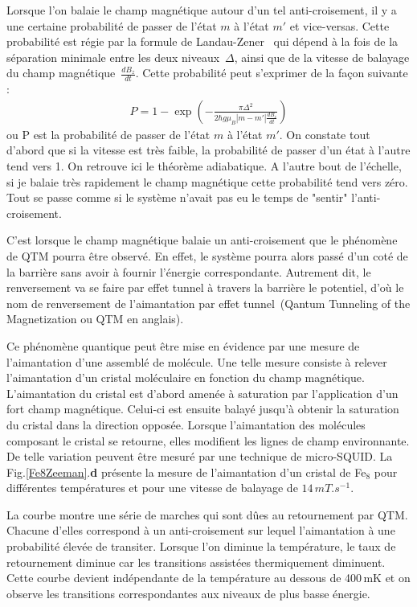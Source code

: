 Lorsque l'on balaie le champ magnétique autour d'un tel anti-croisement, il y a une certaine probabilité de passer de l'état $m$ à l'état $m'$ et vice-versas. Cette probabilité est régie par la formule de Landau-Zener~\cite{Zener1932} qui dépend à la fois de la séparation minimale entre les deux niveaux~$\Delta$, ainsi que de la vitesse de balayage du champ magnétique~$\frac{dB_z}{dt}$. Cette probabilité peut s'exprimer de la façon suivante :
\begin{eqnarray}
P = 1 - \exp \left( -\frac{\pi \Delta^2}{2 \hbar g \mu_B |m-m'|\frac{dB_z}{dt}} \right)
\end{eqnarray}
ou P est la probabilité de passer de l'état $m$ à l'état $m'$. On constate tout d'abord que si la vitesse est très faible, la probabilité de passer d'un état à l'autre tend vers 1. On retrouve ici le théorème adiabatique. A l'autre bout de l'échelle, si je balaie très rapidement le champ magnétique cette probabilité tend vers zéro. Tout se passe comme si le système n'avait pas eu le temps de "sentir" l'anti-croisement.


C'est lorsque le champ magnétique balaie un anti-croisement que le phénomène de QTM pourra être observé. En effet, le système pourra alors passé d'un coté de la barrière sans avoir à fournir l'énergie correspondante. Autrement dit, le renversement va se faire par effet tunnel à travers la barrière le potentiel, d'où le nom de renversement de l'aimantation par effet tunnel~(Qantum Tunneling of the Magnetization ou QTM en anglais).

Ce phénomène quantique peut être mise en évidence par une mesure de l'aimantation d'une assemblé de molécule. Une telle mesure consiste à relever l'aimantation d'un cristal moléculaire en fonction du champ magnétique. L'aimantation du cristal est d'abord amenée à saturation par l'application d'un fort champ magnétique. Celui-ci est ensuite balayé jusqu'à obtenir la saturation du cristal dans la direction opposée. Lorsque l'aimantation des molécules composant le cristal se retourne, elles modifient les lignes de champ environnante. De telle variation peuvent \^etre mesuré par une technique de micro-SQUID. La Fig.\ref{Fe8Zeeman}.\textbf{d} présente la mesure de l'aimantation d'un cristal de Fe$_8$ pour différentes températures et pour une vitesse de balayage de $14\,mT.s^{-1}$.

La courbe montre une série de marches qui sont d\^ues au retournement par QTM. Chacune d'elles correspond à un anti-croisement sur lequel l'aimantation à une probabilité élevée de transiter. Lorsque l'on diminue la température, le taux de retournement diminue car les transitions assistées thermiquement diminuent. Cette courbe devient indépendante de la température au dessous de 400\,mK et on observe les transitions correspondantes aux niveaux de plus basse énergie. 
